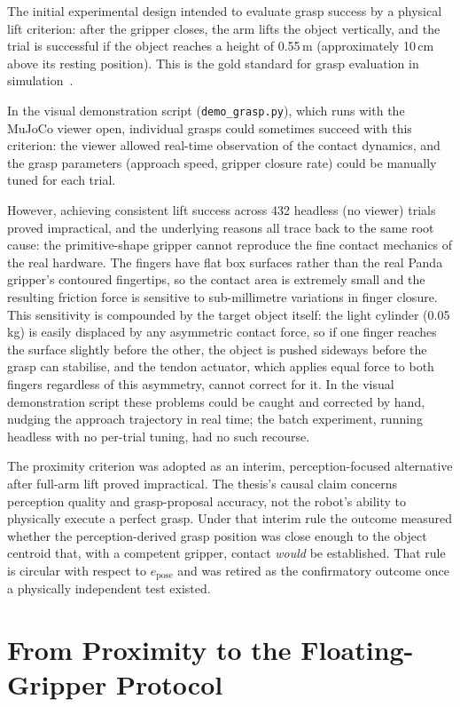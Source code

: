 \documentclass[11pt,a4paper]{report}
\begin{document}
The initial experimental design intended to evaluate grasp success by a physical lift criterion: after the gripper closes, the arm lifts the object vertically, and the trial is successful if the object reaches a height of 0.55\,m (approximately 10\,cm above its resting position). This is the gold standard for grasp evaluation in simulation~\cite{fang2020graspnet}.

In the visual demonstration script (\texttt{demo\_grasp.py}), which runs with the MuJoCo viewer open, individual grasps could sometimes succeed with this criterion: the viewer allowed real-time observation of the contact dynamics, and the grasp parameters (approach speed, gripper closure rate) could be manually tuned for each trial.

However, achieving consistent lift success across 432 headless (no viewer) trials proved impractical, and the underlying reasons all trace back to the same root cause: the primitive-shape gripper cannot reproduce the fine contact mechanics of the real hardware. The fingers have flat box surfaces rather than the real Panda gripper's contoured fingertips, so the contact area is extremely small and the resulting friction force is sensitive to sub-millimetre variations in finger closure. This sensitivity is compounded by the target object itself: the light cylinder (0.05\,kg) is easily displaced by any asymmetric contact force, so if one finger reaches the surface slightly before the other, the object is pushed sideways before the grasp can stabilise, and the tendon actuator, which applies equal force to both fingers regardless of this asymmetry, cannot correct for it. In the visual demonstration script these problems could be caught and corrected by hand, nudging the approach trajectory in real time; the batch experiment, running headless with no per-trial tuning, had no such recourse.

The proximity criterion was adopted as an interim, perception-focused alternative after full-arm lift proved impractical. The thesis's causal claim concerns perception quality and grasp-proposal accuracy, not the robot's ability to physically execute a perfect grasp. Under that interim rule the outcome measured whether the perception-derived grasp position was close enough to the object centroid that, with a competent gripper, contact \emph{would} be established. That rule is circular with respect to $e_{\text{pose}}$ and was retired as the confirmatory outcome once a physically independent test existed.

\section{From Proximity to the Floating-Gripper Protocol}
\label{sec:from_proximity_to_float}
\end{document}
